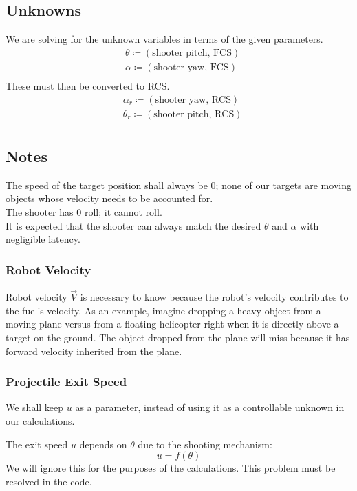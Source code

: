 \documentclass{article}
\begin{document}
\subsection*{Unknowns}
We are solving for the unknown variables in terms of the given parameters.
\begin{align*}
    &\theta\coloneqq(\text{shooter pitch, FCS}) \\
    &\alpha\coloneqq(\text{shooter yaw, FCS}) \\
\end{align*}
These must then be converted to RCS.
\begin{align*}
    &\alpha_r\coloneqq(\text{shooter yaw, RCS}) \\
    &\theta_r\coloneqq(\text{shooter pitch, RCS}) \\
\end{align*}

\subsection*{Notes}
The speed of the target position shall always be 0; none of our targets are moving objects whose velocity needs to be accounted for. \\
The shooter has $0$ roll; it cannot roll. \\
It is expected that the shooter can always match the desired $\theta$ and $\alpha$ with negligible latency.

\subsubsection*{Robot Velocity}
Robot velocity $\vec{V}$ is necessary to know because the robot's velocity contributes to the fuel's velocity. As an example, imagine dropping a heavy object from a moving plane versus from a floating helicopter right when it is directly above a target on the ground. The object dropped from the plane will miss because it has forward velocity inherited from the plane.

\subsubsection*{Projectile Exit Speed}
We shall keep $u$ as a parameter, instead of using it as a controllable unknown in our calculations.

The exit speed $u$ depends on $\theta$ due to the shooting mechanism:
\[ u=f(\theta) \]
We will ignore this for the purposes of the calculations. This problem must be resolved in the code.
\end{document}
